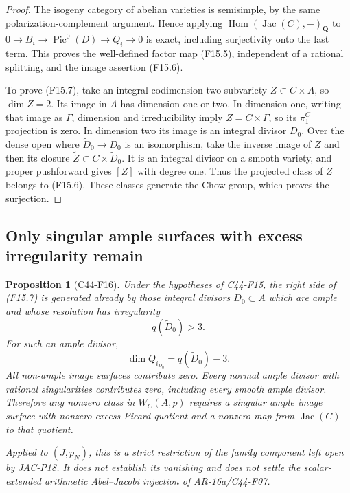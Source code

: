 \documentclass[11pt]{article}
\newtheorem{proposition}[theorem]{Proposition}
\theoremstyle{remark}\newtheorem{remark}[theorem]{Remark}
\begin{document}
\begin{proof}
The isogeny category of abelian varieties is semisimple, by the
same polarization-complement argument.  Hence applying
$\operatorname{Hom}(\operatorname{Jac}(C),-)_{\mathbf Q}$ to
$0\to B_i\to\operatorname{Pic}^0(D)\to Q_i\to0$ is exact,
including surjectivity onto the last term.  This proves the
well-defined factor map (F15.5), independent of a rational
splitting, and the image assertion (F15.6).

To prove (F15.7), take an integral codimension-two subvariety
$Z\subset C\times A$, so $\dim Z=2$.  Its image in $A$ has
dimension one or two.  In dimension one, writing that image as
$\Gamma$, dimension and irreducibility imply
$Z=C\times\Gamma$, so its $\pi_1^C$ projection is zero.
In dimension two its image is an integral divisor $D_0$.
Over the dense open where $\widetilde D_0\to D_0$ is an
isomorphism, take the inverse image of $Z$ and then its closure
$\widetilde Z\subset C\times\widetilde D_0$.
It is an integral divisor on a smooth variety, and proper
pushforward gives $[Z]$ with degree one.  Thus the projected
class of $Z$ belongs to (F15.6).  These classes generate the
Chow group, which proves the surjection.
\end{proof}

\subsection{Only singular ample surfaces with excess irregularity remain}

\begin{proposition}[C44-F16]\label{C44-F16}
Under the hypotheses of C44-F15, the right side of (F15.7) is
generated already by those integral divisors $D_0\subset A$ which
are ample and whose resolution has irregularity
\[
            q(\widetilde D_0)>3.
 \tag{F16.1}
\]
For such an ample divisor,
\[
       \dim Q_{i_{D_0}}=q(\widetilde D_0)-3.
 \tag{F16.2}
\]
All non-ample image surfaces contribute zero.  Every normal ample
divisor with rational singularities contributes zero, including
every smooth ample divisor.  Therefore any nonzero class in
$W_C(A,p)$ requires a singular ample image surface with nonzero
excess Picard quotient and a nonzero map from $\operatorname{Jac}(C)$
to that quotient.

Applied to $(J,p_N)$, this is a strict restriction of the family
component left open by JAC-P18.  It does not establish its vanishing
and does not settle the scalar-extended arithmetic Abel--Jacobi
injection of AR-16a/C44-F07.
\end{proposition}
\end{document}
